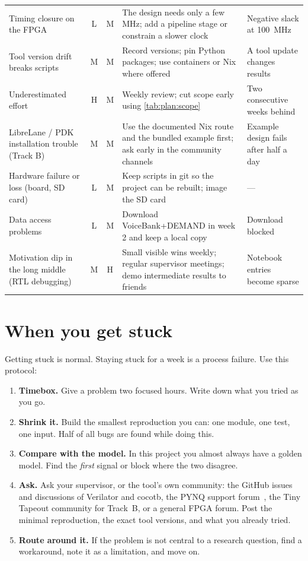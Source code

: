 \begin{xltabular}{\textwidth}{@{}>{\raggedright\arraybackslash}p{0.21\textwidth}ccL>{\raggedright\arraybackslash}p{0.2\textwidth}@{}}
Timing closure on the FPGA & L & M & The design needs only a few MHz; add a pipeline stage or constrain a slower clock & Negative slack at \qty{100}{\MHz} \\
Tool version drift breaks scripts & M & M & Record versions; pin Python packages; use containers or Nix where offered & A tool update changes results \\
Underestimated effort & H & M & Weekly review; cut scope early using \cref{tab:plan:scope} & Two consecutive weeks behind \\
LibreLane / PDK installation trouble (Track B) & M & M & Use the documented Nix route and the bundled example first; ask early in the community channels & Example design fails after half a day \\
Hardware failure or loss (board, SD card) & L & M & Keep scripts in git so the project can be rebuilt; image the SD card & --- \\
Data access problems & L & M & Download VoiceBank+DEMAND in week 2 and keep a local copy & Download blocked \\
Motivation dip in the long middle (RTL debugging) & M & H & Small visible wins weekly; regular supervisor meetings; demo intermediate results to friends & Notebook entries become sparse \\
\end{xltabular}

\section{When you get stuck}\label{sec:plan:stuck}

Getting stuck is normal. Staying stuck for a week is a process failure. Use this
protocol:

\begin{enumerate}
  \item \textbf{Timebox.} Give a problem two focused hours. Write down what you
        tried as you go.
  \item \textbf{Shrink it.} Build the smallest reproduction you can: one module,
        one test, one input. Half of all bugs are found while doing this.
  \item \textbf{Compare with the model.} In this project you almost always have a
        golden model. Find the \emph{first} signal or block where the two
        disagree.
  \item \textbf{Ask.} Ask your supervisor, or the tool's own community: the
        GitHub issues and discussions of Verilator and cocotb, the PYNQ support
        forum~\cite{ch12-13:pynqforum}, the Tiny Tapeout community for Track~B,
        or a general FPGA forum. Post the minimal reproduction, the exact tool
        versions, and what you already tried.
  \item \textbf{Route around it.} If the problem is not central to a research
        question, find a workaround, note it as a limitation, and move on.
\end{enumerate}

